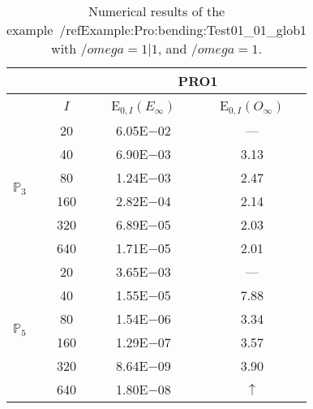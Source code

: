\begin{table}[H]
\caption{Numerical results of the example~/ref{Example:Pro:bending:Test01_01_glob1} with $/omega=1|1$, and $/omega=1$.}
\setlength{\tabcolsep}{5pt}
\centering
\begin{tabular}{@{}l c c c@{}}
\toprule
 &  & \multicolumn{2}{c}{PRO1}\\
\midrule
 & $I$ & E$_{0,I}(E_{\infty})$ & E$_{0,I}(O_{\infty})$\\
\midrule
\multirow{6}{*}{$\mathbb{P}_{3}$}
 & 20 & 6.05E$-$02 & ---\\
 & 40 & 6.90E$-$03 & 3.13\\
 & 80 & 1.24E$-$03 & 2.47\\
 & 160 & 2.82E$-$04 & 2.14\\
 & 320 & 6.89E$-$05 & 2.03\\
 & 640 & 1.71E$-$05 & 2.01\\
\midrule
\multirow{6}{*}{$\mathbb{P}_{5}$}
 & 20 & 3.65E$-$03 & ---\\
 & 40 & 1.55E$-$05 & 7.88\\
 & 80 & 1.54E$-$06 & 3.34\\
 & 160 & 1.29E$-$07 & 3.57\\
 & 320 & 8.64E$-$09 & 3.90\\
 & 640 & 1.80E$-$08 & $\uparrow$\\
\bottomrule
\end{tabular}
\label{Table:PRO:test_01_01_test31_pro1}
\end{table}
